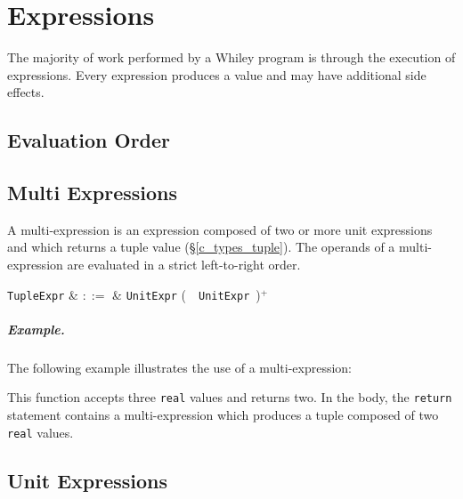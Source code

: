\chapter{Expressions}
The majority of work performed by a Whiley program is through the execution of \glspl{expression}.  Every expression produces a \gls{value} and may have additional side effects.

\section{Evaluation Order}


\section{Multi Expressions}
\label{c_expr_tuple}
A multi-expression is an expression composed of two or more unit expressions and which returns a tuple value (\S\ref{c_types_tuple}).  The operands of a multi-expression are evaluated in a strict left-to-right order.

\begin{syntax}
  \verb+TupleExpr+ & $::=$ & \verb+UnitExpr+ \big(\ \token{,}\ \verb+UnitExpr+\ \big)$^+$ \\
\end{syntax}

\paragraph{Example.}  The following example illustrates the use of a multi-expression:



This function accepts three \lstinline{real} values and returns two.  In the body, the \lstinline{return} statement contains a multi-expression which produces a tuple composed of two \lstinline{real} values.


\section{Unit Expressions}
\label{c_expr_unit}

